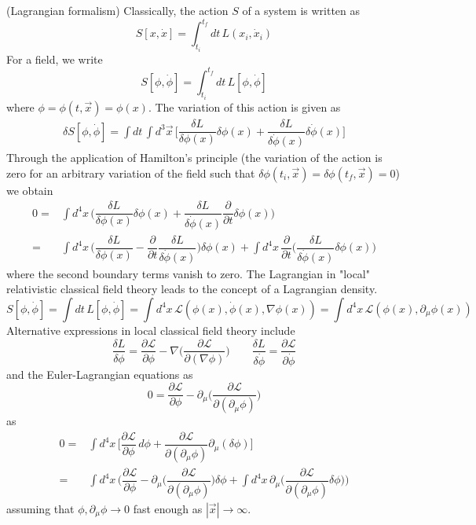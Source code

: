 \begin{thm}
(Lagrangian formalism) Classically, the action $S$ of a system is written as
\[S[x,\dot{x}]=\int ^{t_{f}}_{t_{i}}dt\,L(x_{i},\dot{x}_{i})\]
For a field, we write
\[S[\phi ,\dot{\phi }]=\int ^{t_{f}}_{t_{i}}dt\,L[\phi ,\dot{\phi }]\]
where $\phi =\phi (t,\vec{x})=\phi (x)$. The variation of this action is given as
\[\begin{align*}
	\delta S[\phi ,\dot{\phi }]=\int dt\,\int  d^3\vec{x}\,\Big[\dfrac{\delta L}{\delta \phi (x)}\delta \phi (x)+\dfrac{\delta L}{\delta \dot{\phi }(x)}\delta \dot{\phi }(x)\Big]
\end{align*}\]
Through the application of Hamilton's principle (the variation of the action is zero for an arbitrary variation of the field such that $\delta \phi (t_{i},\vec{x})=\delta \phi (t_{f},\vec{x})=0$) we obtain
\[\begin{align*}
	0=&\int d^{4}x\,\Big(\dfrac{\delta L}{\delta \phi (x)}\delta \phi (x)+\dfrac{\delta L}{\delta \dot{\phi }(x)}\dfrac{\partial }{\partial t}\delta \phi (x) \Big)\\
	=&\int d^{4}x\,\Big(\dfrac{\delta L}{\delta \phi (x)}-\dfrac{\partial }{\partial t}\dfrac{\delta L}{\delta \dot{\phi }(x)} \Big)\delta \phi (x)+\int d^{4}x\,\dfrac{\partial }{\partial t}\Big(\dfrac{\delta L}{\delta \dot{\phi }(x)}\delta \phi (x)\Big) 
\end{align*}\]
where the second boundary terms vanish to zero. The Lagrangian in "local" relativistic classical field theory leads to the concept of a Lagrangian density.
\[S[\phi ,\dot{\phi }]=\int dt\,L[\phi ,\dot{\phi }]=\int d^{4}x\,\mathcal{L}(\phi (x),\dot{\phi }(x),\nabla \phi (x))=\int d^{4}x\,\mathcal{L}(\phi (x),\partial _{\mu }\phi (x))\]
Alternative expressions in local classical field theory include
	\[\dfrac{\delta L}{\delta \phi }=\dfrac{\partial \mathcal{L}}{\partial \phi }-\nabla \Big(\dfrac{\partial \mathcal{L}}{\partial (\nabla \phi )} \Big)\qquad \dfrac{\delta L}{\delta \dot{\phi }}=\dfrac{\partial \mathcal{L}}{\partial \dot{\phi }}  \]
and the Euler-Lagrangian equations as
\[0=\dfrac{\partial \mathcal{L}}{\partial \phi }-\partial _{\mu }\Big(\dfrac{\partial \mathcal{L}}{\partial (\partial _{\mu }\phi )} \Big) \]
as
\[\begin{align*}
	0=&\int d^{4}x\,\Big[\dfrac{\partial \mathcal{L}}{\partial \phi }\,d\phi +\dfrac{\partial \mathcal{L}}{\partial (\partial _{\mu }\phi )}\partial _{\mu }(\delta \phi ) \Big]\\
	=&\int d^{4}x\,\Big(\dfrac{\partial \mathcal{L}}{\partial \phi }-\partial _{\mu }\Big(\dfrac{\partial \mathcal{L}}{\partial  (\partial_{\mu }\phi  )} \Big)\delta \phi +\int d^{4}x\,\partial _{\mu }\Big(\dfrac{\partial \mathcal{L}}{\partial (\partial _{\mu }\phi )}\delta \phi \Big) \Big)
\end{align*}\]
assuming that $\phi ,\partial _{\mu }\phi \rightarrow 0	$ fast enough as $|\vec{x}|\rightarrow \infty $. 
\end{thm}
